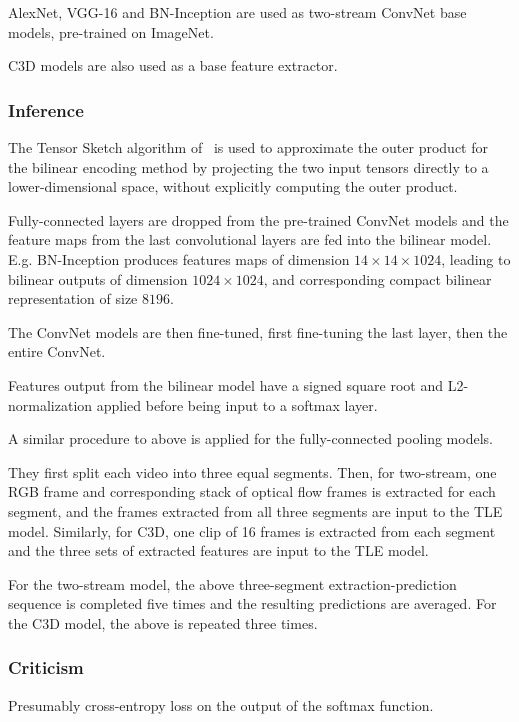 \documentclass[a4paper, 12pt]{article}
\begin{document}
AlexNet, VGG-16 and BN-Inception are used as two-stream ConvNet base models,
pre-trained on ImageNet.

C3D models are also used as a base feature extractor.

\subsubsection{Inference}

The Tensor Sketch algorithm of~\citet{Pham:2013:FSP:2487575.2487591} is used to
approximate the outer product for the bilinear encoding method by projecting
the two input tensors directly to a lower-dimensional space, without explicitly
computing the outer product.

Fully-connected layers are dropped from the pre-trained ConvNet models and the
feature maps from the last convolutional layers are fed into the bilinear
model. E.g. BN-Inception produces features maps of dimension $14 \times 14
\times 1024$, leading to bilinear outputs of dimension $1024 \times 1024$, and
corresponding compact bilinear representation of size $8196$.

The ConvNet models are then fine-tuned, first fine-tuning the last layer, then
the entire ConvNet.

Features output from the bilinear model have a signed square root and
L2-normalization applied before being input to a softmax layer.

A similar procedure to above is applied for the fully-connected pooling models.

They first split each video into three equal segments. Then, for two-stream,
one RGB frame and corresponding stack of optical flow frames is extracted for
each segment, and the frames extracted from all three segments are input to the
TLE model. Similarly, for C3D, one clip of 16 frames is extracted from each
segment and the three sets of extracted features are input to the TLE model.

For the two-stream model, the above three-segment extraction-prediction
sequence is completed five times and the resulting predictions are averaged.
For the C3D model, the above is repeated three times.

\subsubsection{Criticism}

Presumably cross-entropy loss on the output of the softmax function.
\end{document}
